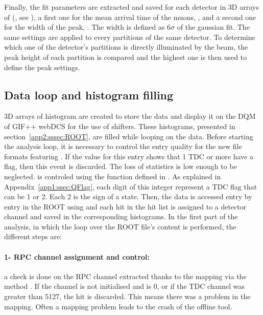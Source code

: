 	Finally, the fit parameters are extracted and saved for each detector in 3D arrays of  (, see ), a first one for the mean arrival time of the muons, , and a second one for the width of the peak, . The width is defined as 6$\sigma$ of the gaussian fit. The same settings are applied to every partitions of the same detector. To determine which one of the detector's partitions is directly illuminated by the beam, the peak height of each partition is compared and the highest one is then used to define the peak settings.
	
	\subsection{Data loop and histogram filling}
	\label{app2:ssec:dataloop}
	
	3D arrays of histogram are created to store the data and display it on the DQM of GIF++ webDCS for the use of shifters. These histograms, presented in section~\ref{app2:sssec:ROOT}, are filled while looping on the data. Before starting the analysis loop, it is necessary to control the entry quality for the new file formats featuring . If the  value for this entry shows that 1 TDC or more have a  flag, then this event is discarded. The loss of statistics is low enough to be neglected.  is controled using the function  defined in . As explained in Appendix~\ref{app1:ssec:QFlag}, each digit of this integer represent a TDC flag that can be 1 or 2. Each 2 is the sign of a  state. Then, the data is accessed entry by entry in the ROOT  using  and each hit in the hit list is assigned to a detector channel and saved in the corresponding histograms. In the first part of the analysis, in which the loop over the ROOT file's content is performed, the different steps are:
	
	\paragraph{1- RPC channel assignment and control:} a check is done on the RPC channel extracted thanks to the mapping via the method . If the channel is not initialised and is 0, or if the TDC channel was greater than 5127, the hit is discarded. This means there was a problem in the mapping. Often a mapping problem leads to the crash of the offline tool.
	
